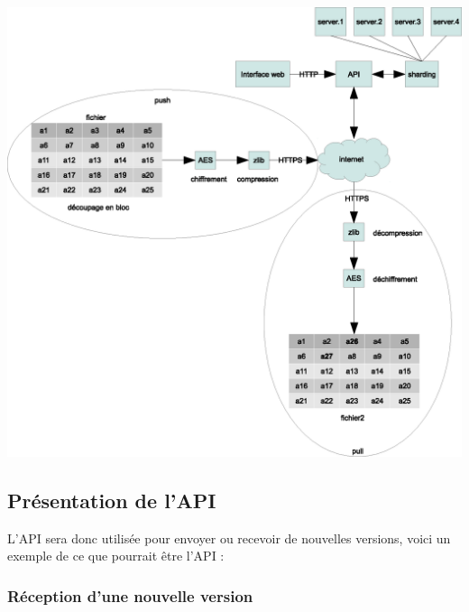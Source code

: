 \includegraphics[scale=0.5]{img/schema.eps}

\subsection{Présentation de l'API}

L'API sera donc utilisée pour envoyer ou recevoir de nouvelles versions, voici un exemple de ce que pourrait être l'API :

\subsubsection{Réception d'une nouvelle version}

